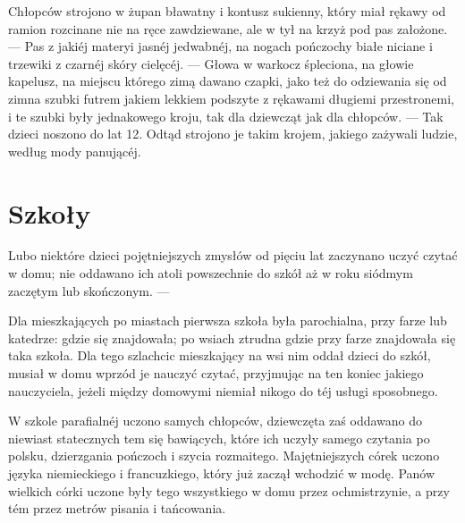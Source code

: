 \documentclass{book}
\begin{document}
Chłopców strojono w żupan bławatny i kontusz sukienny, który miał rękawy od ramion rozcinane nie na ręce zawdziewane, ale w tył na krzyż pod pas założone. — Pas z jakiéj materyi jasnéj jedwabnéj, na nogach pończochy białe niciane i trzewiki z czarnéj skóry cielęcéj. — Głowa w warkocz śpleciona, na głowie kapelusz, na miejscu którego zimą dawano czapki, jako też do odziewania się od zimna szubki futrem jakiem lekkiem podszyte z rękawami długiemi przestronemi, i te szubki były jednakowego kroju, tak dla dziewcząt jak dla chłopców. — Tak dzieci noszono do lat 12. Odtąd strojono je takim krojem, jakiego zażywali ludzie, według mody panującéj.

\section{Szkoły}

Lubo niektóre dzieci pojętniejszych zmysłów od pięciu lat zaczynano uczyć czytać w domu; nie oddawano ich atoli powszechnie do szkół aż w roku siódmym zaczętym lub skończonym. —

Dla mieszkających po miastach pierwsza szkoła była parochialna, przy farze lub katedrze: gdzie się znajdowała; po wsiach ztrudna gdzie przy farze znajdowała się taka szkoła. Dla tego szlachcic mieszkający na wsi nim oddał dzieci do szkół, musiał w domu wprzód je nauczyć czytać, przyjmując na ten koniec jakiego nauczyciela, jeżeli między domowymi niemiał nikogo do téj usługi sposobnego.

W szkole parafialnéj uczono samych chłopców, dziewczęta zaś oddawano do niewiast statecznych tem się bawiących, które ich uczyły samego czytania po polsku, dzierzgania pończoch i szycia rozmaitego. Majętniejszych córek uczono języka niemieckiego i francuzkiego, który już zaczął wchodzić w modę. Panów wielkich córki uczone były tego wszystkiego w domu przez ochmistrzynie, a przy tém przez metrów pisania i tańcowania.
\end{document}
